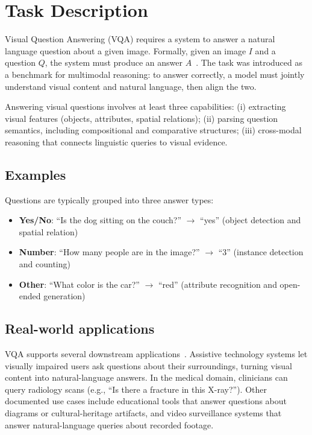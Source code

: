\section{Task Description}

Visual Question Answering (VQA) requires a system to answer a natural language question about a given image. Formally, given an image $I$ and a question $Q$, the system must produce an answer $A$~\cite{antol2015vqa}. The task was introduced as a benchmark for multimodal reasoning: to answer correctly, a model must jointly understand visual content and natural language, then align the two.

Answering visual questions involves at least three capabilities: (i) extracting visual features (objects, attributes, spatial relations); (ii) parsing question semantics, including compositional and comparative structures; (iii) cross-modal reasoning that connects linguistic queries to visual evidence.

\subsection{Examples}

Questions are typically grouped into three answer types:

\begin{itemize}
    \item \textbf{Yes/No}: ``Is the dog sitting on the couch?'' $\rightarrow$ ``yes'' (object detection and spatial relation)
    \item \textbf{Number}: ``How many people are in the image?'' $\rightarrow$ ``3'' (instance detection and counting)
    \item \textbf{Other}: ``What color is the car?'' $\rightarrow$ ``red'' (attribute recognition and open-ended generation)
\end{itemize}

\subsection{Real-world applications}

VQA supports several downstream applications~\cite{vqa_survey}. Assistive technology systems let visually impaired users ask questions about their surroundings, turning visual content into natural-language answers. In the medical domain, clinicians can query radiology scans (e.g., ``Is there a fracture in this X-ray?''). Other documented use cases include educational tools that answer questions about diagrams or cultural-heritage artifacts, and video surveillance systems that answer natural-language queries about recorded footage.
